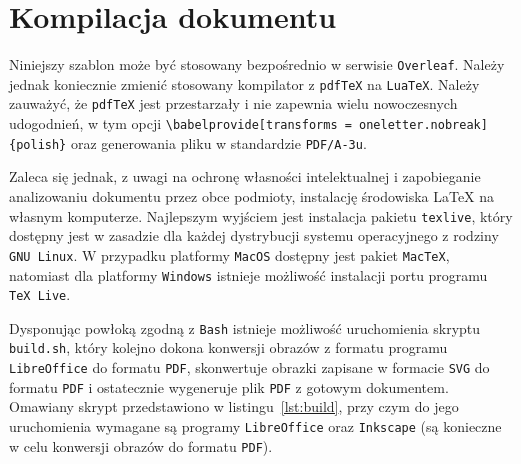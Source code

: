 \chapter{Kompilacja dokumentu}

Niniejszy szablon może być stosowany bezpośrednio w serwisie \verb|Overleaf|. Należy jednak koniecznie zmienić stosowany kompilator z \verb|pdfTeX| na \verb|LuaTeX|. Należy zauważyć, że \verb|pdfTeX| jest przestarzały i nie zapewnia wielu nowoczesnych udogodnień, w tym opcji \verb|\babelprovide[transforms = oneletter.nobreak]{polish}| oraz generowania pliku w standardzie \verb|PDF/A-3u|.

Zaleca się jednak, z uwagi na ochronę własności intelektualnej i zapobieganie analizowaniu dokumentu przez obce podmioty, instalację środowiska \LaTeX{} na własnym komputerze. Najlepszym wyjściem jest instalacja pakietu \verb|texlive|, który dostępny jest w zasadzie dla każdej dystrybucji systemu operacyjnego z rodziny \verb|GNU Linux|. W przypadku platformy \verb|MacOS| dostępny jest pakiet \verb|MacTeX|, natomiast dla platformy \verb|Windows| istnieje możliwość instalacji portu programu \verb|TeX Live|.

Dysponując powłoką zgodną z \verb|Bash| istnieje możliwość uruchomienia skryptu \verb|build.sh|, który kolejno dokona konwersji obrazów z formatu programu \verb|LibreOffice| do formatu \verb|PDF|, skonwertuje obrazki zapisane w formacie \verb|SVG| do formatu \verb|PDF| i ostatecznie wygeneruje plik \verb|PDF| z gotowym dokumentem. Omawiany skrypt przedstawiono w listingu~\ref{lst:build}, przy czym do jego uruchomienia wymagane są programy \verb|LibreOffice| oraz \verb|Inkscape| (są konieczne w celu konwersji obrazów do formatu \verb|PDF|).

\begin{listing}[hbt!]
\inputminted[linenos, breaklines]{bash}{build.sh}
\end{listing}
